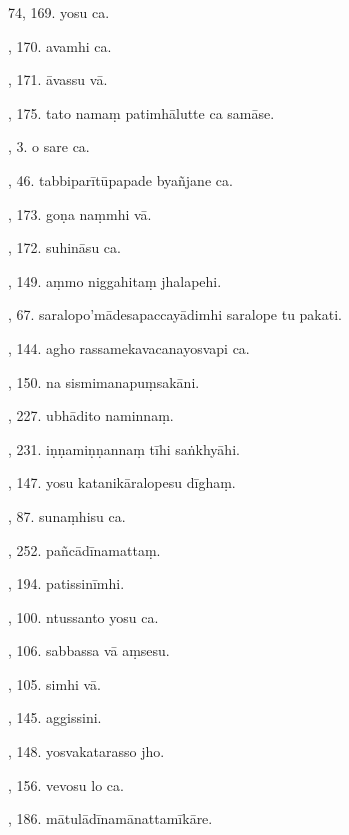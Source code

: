 74, 169. yosu ca.\hfill \pageref{sut:74}\par {}, 170. avamhi ca.\hfill \pageref{sut:75}\par {}, 171. āvassu vā.\hfill \pageref{sut:76}\par {}, 175. tato namaṃ patimhālutte ca samāse.\hfill \pageref{sut:77}\par {}, 3. o sare ca.\hfill \pageref{sut:78}\par {}, 46. tabbiparītūpapade byañjane ca.\hfill \pageref{sut:79}\par {}, 173. goṇa naṃmhi vā.\hfill \pageref{sut:80}\par {}, 172. suhināsu ca.\hfill \pageref{sut:81}\par {}, 149. aṃmo niggahitaṃ jhalapehi.\hfill \pageref{sut:82}\par {}, 67. saralopo’mādesapaccayādimhi saralope tu pakati.\hfill \pageref{sut:83}\par {}, 144. agho rassamekavacanayosvapi ca.\hfill \pageref{sut:84}\par {}, 150. na sismimanapuṃsakāni.\hfill \pageref{sut:85}\par {}, 227. ubhādito naminnaṃ.\hfill \pageref{sut:86}\par {}, 231. iṇṇamiṇṇannaṃ tīhi saṅkhyāhi.\hfill \pageref{sut:87}\par {}, 147. yosu katanikāralopesu dīghaṃ.\hfill \pageref{sut:88}\par {}, 87. sunaṃhisu ca.\hfill \pageref{sut:89}\par {}, 252. pañcādīnamattaṃ.\hfill \pageref{sut:90}\par {}, 194. patissinīmhi.\hfill \pageref{sut:91}\par {}, 100. ntussanto yosu ca.\hfill \pageref{sut:92}\par {}, 106. sabbassa vā aṃsesu.\hfill \pageref{sut:93}\par {}, 105. simhi vā.\hfill \pageref{sut:94}\par {}, 145. aggissini.\hfill \pageref{sut:95}\par {}, 148. yosvakatarasso jho.\hfill \pageref{sut:96}\par {}, 156. vevosu lo ca.\hfill \pageref{sut:97}\par {}, 186. mātulādīnamānattamīkāre.\hfill \pageref{sut:98}\par \noindent
